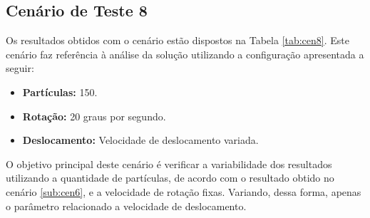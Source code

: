\subsection{Cenário de Teste 8}
\label{sub:cen8}

Os resultados obtidos com o cenário estão dispostos na Tabela \ref{tab:cen8}. Este cenário faz referência à análise da solução
utilizando a configuração apresentada a seguir:

\begin{itemize}
  \item \textbf{Partículas:} 150.
  \item \textbf{Rotação:} 20 graus por segundo.
  \item \textbf{Deslocamento:} Velocidade de deslocamento variada.
\end{itemize}

O objetivo principal deste cenário é verificar a variabilidade dos resultados utilizando a quantidade de partículas, de
acordo com o resultado obtido no cenário \ref{sub:cen6}, e a velocidade de rotação fixas. Variando, dessa forma, apenas
o parâmetro relacionado a velocidade de deslocamento.

